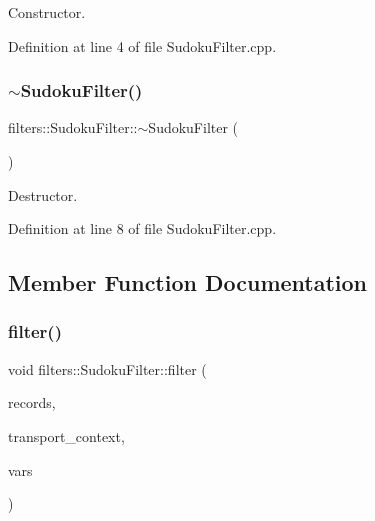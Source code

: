 Constructor. 



Definition at line 4 of file Sudoku\+Filter.\+cpp.

\mbox{\label{classfilters_1_1SudokuFilter_afd43981e802eb6cceb68cdeb381a6d69}} 
\subsubsection{\texorpdfstring{$\sim$\+Sudoku\+Filter()}{~SudokuFilter()}}
{\footnotesize\ttfamily filters\+::\+Sudoku\+Filter\+::$\sim$\+Sudoku\+Filter (\begin{DoxyParamCaption}{ }\end{DoxyParamCaption})\hspace{0.3cm}{\ttfamily [virtual]}}



Destructor. 



Definition at line 8 of file Sudoku\+Filter.\+cpp.



\subsection{Member Function Documentation}
\mbox{\label{classfilters_1_1SudokuFilter_a45e7f165bbed159d73c5784d1a53bf2a}} 
\subsubsection{\texorpdfstring{filter()}{filter()}}
{\footnotesize\ttfamily void filters\+::\+Sudoku\+Filter\+::filter (\begin{DoxyParamCaption}\item[{madara\+::knowledge\+::\+Knowledge\+Map \&}]{records,  }\item[{const madara\+::transport\+::\+Transport\+Context \&}]{transport\+\_\+context,  }\item[{madara\+::knowledge\+::\+Variables \&}]{vars }\end{DoxyParamCaption})\hspace{0.3cm}{\ttfamily [virtual]}}



